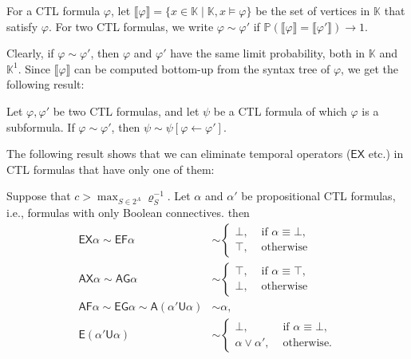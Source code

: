 \documentclass[runngingheads]{llncs}
\newcommand{\sem}[1]{\llbracket #1 \rrbracket}
\begin{document}
\begin{definition}
For a CTL formula $\varphi$, let $\sem{\varphi} = \{x\in \mathbb{K} \mid \mathbb{K},x \models \varphi\}$ be the set of vertices in $\mathbb{K}$ that satisfy $\varphi$. For two CTL formulas, we write $\varphi \sim \varphi'$ if $\mathbb{P}(\sem{\varphi} = \sem{\varphi'}) \rightarrow 1$.
\end{definition}

Clearly, if $\varphi \sim \varphi'$, then $\varphi$ and $\varphi'$ have the same limit probability, both in $\mathbb{K}$ and $\mathbb{K}^1$. Since $\sem{\varphi}$ can be computed bottom-up from the syntax tree of $\varphi$, we get the following result:

\begin{lemma} \label{lem:rep}
Let $\varphi,\varphi'$ be two CTL formulas, and let $\psi$ be a CTL formula of which $\varphi$ is a subformula. If $\varphi \sim \varphi'$, then $\psi \sim \psi[\varphi \leftarrow \varphi']$.
\end{lemma}

The following result shows that we can eliminate temporal operators ($\mathsf{EX}$ etc.) in CTL formulas that have only one of them:

\begin{lemma} \label{lem:bustep}
Suppose that $c > \max_{S \in 2^A} \varrho_S^{-1}$. Let $\alpha$ and $\alpha'$ be propositional CTL formulas, i.e., formulas with only Boolean connectives. then
\begin{align*}
\mathsf{EX}\alpha \sim \mathsf{EF}\alpha &\sim \begin{cases}
\bot, & \textrm{ if $\alpha \equiv \bot$},\\
\top, & \textrm{ otherwise}
\end{cases}\\
\mathsf{AX} \alpha \sim \mathsf{AG}\alpha &\sim \begin{cases}
\top, & \textrm{ if $\alpha \equiv \top$},\\
\bot, & \textrm{ otherwise}
\end{cases}\\
\mathsf{AF}\alpha \sim \mathsf{EG}\alpha \sim \mathsf{A}(\alpha'\mathsf{U}\alpha) &\sim \alpha,\\
\mathsf{E}(\alpha'\mathsf{U}\alpha) &\sim \begin{cases}
\bot, & \textrm{ if $\alpha \equiv \bot$},\\
\alpha \vee \alpha', & \textrm{ otherwise.}
\end{cases}
\end{align*}
\end{lemma}
\end{document}
